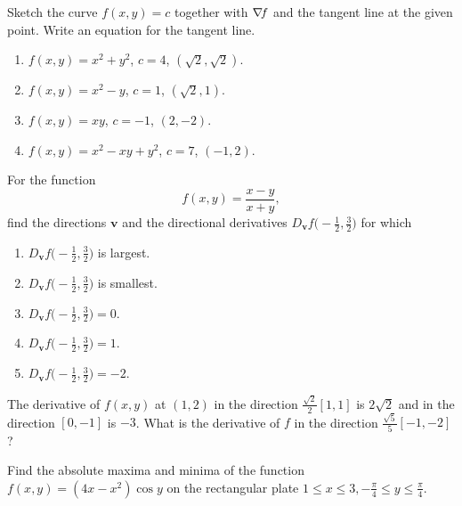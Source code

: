 \begin{problem}[Basic]
Sketch the curve $f(x,y)=c$ together with $\mathop{\nabla\! {f}}$ and the tangent line at the given point.  Write an equation for the tangent line.
\begin{enumerate}
	\item $f(x,y)=x^2+y^2$, $c=4$, $(\sqrt{2}, \sqrt{2})$.
	\item $f(x,y)=x^2-y$, $c=1$, $(\sqrt{2}, 1)$.
	\item $f(x,y)=xy$, $c=-1$, $(2, -2)$.
	\item $f(x,y)=x^2-xy+y^2$, $c=7$, $(-1,2)$.
\end{enumerate}
\end{problem}

\begin{problem}[Basic]
For the function
\begin{equation*}
f(x,y) = \frac{x-y}{x+y},
\end{equation*}
find the directions $\boldsymbol{v}$ and the directional derivatives $D_{\boldsymbol{v}}f\big( -\tfrac{1}{2}, \tfrac{3}{2}\big)$ for which
\begin{enumerate}
	\item $D_{\boldsymbol{v}}f\big( -\tfrac{1}{2}, \tfrac{3}{2}\big)$ is largest.
	\item $D_{\boldsymbol{v}}f\big( -\tfrac{1}{2}, \tfrac{3}{2}\big)$ is smallest.
	\item $D_{\boldsymbol{v}}f\big( -\tfrac{1}{2}, \tfrac{3}{2}\big) = 0$.
	\item $D_{\boldsymbol{v}}f\big( -\tfrac{1}{2}, \tfrac{3}{2}\big) = 1$.
	\item $D_{\boldsymbol{v}}f\big( -\tfrac{1}{2}, \tfrac{3}{2}\big) = -2$.
\end{enumerate}
\end{problem}

\begin{problem}[Intermediate]
The derivative of $f(x,y)$ at $(1,2)$ in the direction $\frac{\sqrt{2}}{2}[1,1]$ is $2\sqrt{2}$ and in the direction $[0,-1]$ is $-3$.  What is the derivative of $f$ in the direction $\frac{\sqrt{5}}{5}[-1,-2]$?
\end{problem}

\begin{problem}[Intermediate]
Find the absolute maxima and minima of the function $f(x,y) = (4x-x^2)\cos y$ on the rectangular plate $1\leq x \leq 3, -\frac{\pi}{4} \leq y \leq \frac{\pi}{4}$.
\end{problem}

